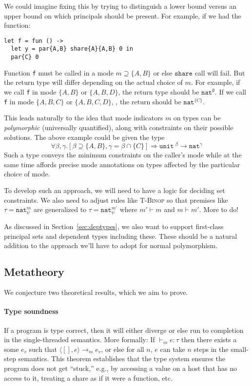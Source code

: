 \documentclass[10pt]{article}
\newcommand{\rulelab}[1]{{\small \textsc{#1}}}
\newcommand{\kw}[1]{\ensuremath{\mathtt{#1}}}
\newcommand{\tnat}{\ensuremath{\mathtt{nat}}}
\newcommand{\tfun}[3]{\ensuremath{{#1} ~^{#3}\!\!\rightarrow {#2}}}
\newcommand{\hastyp}[4]{\ensuremath{{#1} \vdash_{#2} {#3} : {#4}}}
\newcommand{\eval}[4]{\ensuremath{\config{#1}{#3} \longrightarrow_{#2} {#4}}}
\newcommand{\config}[2]{\ensuremath{\langle{#1},{#2}\rangle}}
\begin{document}
We could imagine fixing this by trying to distinguish a lower bound
versus an upper bound on which principals should be present. For example,
if we had the function:
\begin{verbatim}
let f = fun () ->
  let y = par{A,B} share{A}{A,B} 0 in
  par{C} 0
\end{verbatim}
Function \texttt{f} must be called in a mode $m \supseteq \{A,B\}$ or
else $\kw{share}$ call will fail. But the return type will differ
depending on the actual choice of $m$. For example, if we call
\texttt{f} in mode $\{A,B\}$ or $\{A,B,D\}$, the return type should be
$\tnat^\emptyset$. If we call \texttt{f} in mode $\{A,B,C\}$ or
$\{A,B,C,D\}$, , the return should be $\tnat^{\{C\}}$.

This leads naturally to the idea that mode indicators $m$ on types can
be \emph{polymorphic} (universally quantified), along with constraints
on their possible solutions. The above example could be given the type
$$
\forall \beta, \gamma. [\beta \supseteq \{A,B\}, \gamma = \beta \cap
\{C\}] \Rightarrow \tfun{\kw{unit}}{\tnat^\gamma}{\beta}
$$
Such a type conveys the minimum constraints on the caller's mode while
at the same time affords precise mode annotations on types affected by
the particular choice of mode.

To develop such an approach, we will need to have a logic for deciding
set constraints. We also need to adjust rules like \rulelab{T-Binop}
so that premises like $\tau = \tnat^m_\psi$ are generalized to
$\tau = \tnat^{m'}_\psi$ where $m' \vdash m$ and $m \vdash m'$. More
to do!

As discussed in Section~\ref{sec:deptypes}, we also want to support
first-class principal sets and dependent types including these. These
should be a natural addition to the approach we'll have to adopt for
normal polymorphism.

\subsection{Metatheory}

We conjecture two theoretical results, which we aim to prove.

\paragraph{Type soundness} If a program is type
correct, then it will either diverge or else run to completion in the
single-threaded semantics. More formally: If $\hastyp{}{m}{e}{\tau}$
then there exists a some $e_v$ such that $\eval{[]}{m}{e}{e_v}$, or
else for all $n$, $e$ can take $n$ steps in the small-step
semantics. This theorem establishes that the type system ensures the
program does not get ``stuck,'' e.g., by accessing a value on a host
that has no access to it, treating a share as if it were a function,
etc.
\end{document}
